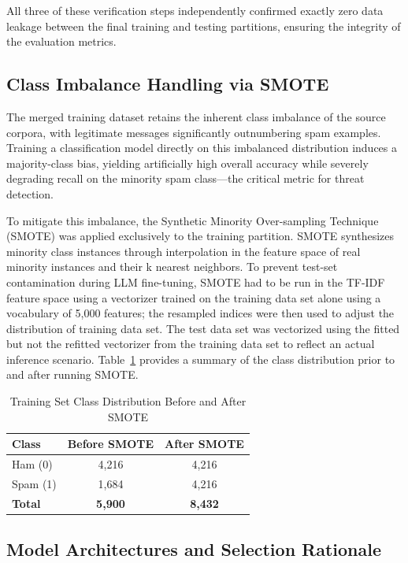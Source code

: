 \documentclass[journal]{IEEEtran}
\begin{document}
All three of these verification steps independently confirmed exactly zero data leakage between the final training and testing partitions, ensuring the integrity of the evaluation metrics.

\subsection{Class Imbalance Handling via SMOTE}

The merged training dataset retains the inherent class imbalance of the source corpora, with legitimate messages significantly outnumbering spam examples. Training a classification model directly on this imbalanced distribution induces a majority-class bias, yielding artificially high overall accuracy while severely degrading recall on the minority spam class---the critical metric for threat detection.

To mitigate this imbalance, the Synthetic Minority Over-sampling Technique (SMOTE) was applied exclusively to the training partition.
SMOTE synthesizes minority class instances through interpolation in the
feature space of real minority instances and their k nearest neighbors.
To prevent test-set contamination during LLM fine-tuning, SMOTE had to be run in the TF-IDF feature space using a vectorizer
trained on the training data set alone using a vocabulary of 5,000
features; the resampled indices were then used to adjust the
distribution of training data set. The test data set was vectorized
using the fitted but not the refitted vectorizer from the training data
set to reflect an actual inference scenario. Table~\ref{tab:smote} provides a summary
of the class distribution prior to and after running SMOTE.

\begin{table}[htbp]
\caption{Training Set Class Distribution Before and After SMOTE}
\label{tab:smote}
\centering
\begin{tabular}{lcc}
\toprule
\textbf{Class} & \textbf{Before SMOTE} & \textbf{After SMOTE} \\
\midrule
Ham (0) & 4,216 & 4,216 \\
Spam (1) & 1,684 & 4,216 \\
\textbf{Total} & \textbf{5,900} & \textbf{8,432} \\
\bottomrule
\end{tabular}
\end{table}

\subsection{Model Architectures and Selection Rationale}
\end{document}

